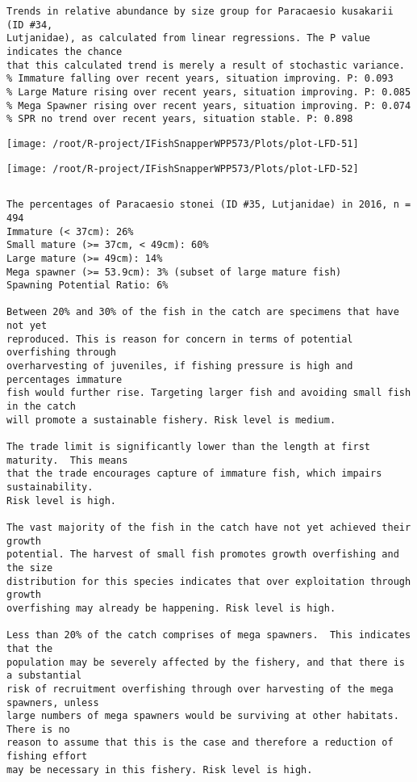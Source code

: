 \documentclass{report}\usepackage[]{graphicx}\usepackage[]{color}
\makeatletter
\def\maxwidth{ %
  \ifdim\Gin@nat@width>\linewidth
    \linewidth
  \else
    \Gin@nat@width
  \fi
}
\newenvironment{kframe}{%
 \def\at@end@of@kframe{}%
 \ifinner\ifhmode%
  \def\at@end@of@kframe{\end{minipage}}%
  \begin{minipage}{\columnwidth}%
 \fi\fi%
 \def\FrameCommand##1{\hskip\@totalleftmargin \hskip-\fboxsep
 \colorbox{shadecolor}{##1}\hskip-\fboxsep
     \hskip-\linewidth \hskip-\@totalleftmargin \hskip\columnwidth}%
 \MakeFramed {\advance\hsize-\width
   \@totalleftmargin\z@ \linewidth\hsize
   \@setminipage}}%
 {\par\unskip\endMakeFramed%
 \at@end@of@kframe}
\newenvironment{knitrout}{}{} %
\makeatother
\begin{document}
\begin{knitrout}
\begin{kframe}
\begin{verbatim}
Trends in relative abundance by size group for Paracaesio kusakarii (ID #34,
Lutjanidae), as calculated from linear regressions. The P value indicates the chance
that this calculated trend is merely a result of stochastic variance.
% Immature falling over recent years, situation improving. P: 0.093
% Large Mature rising over recent years, situation improving. P: 0.085
% Mega Spawner rising over recent years, situation improving. P: 0.074
% SPR no trend over recent years, situation stable. P: 0.898
\end{verbatim}
\end{kframe}
\texttt{[image: /root/R-project/IFishSnapperWPP573/Plots/plot-LFD-51]} 

\texttt{[image: /root/R-project/IFishSnapperWPP573/Plots/plot-LFD-52]} 
\begin{kframe}\begin{verbatim}
\end{verbatim}
\end{kframe}
\clearpage
\newpage
\begin{kframe}\begin{verbatim}The percentages of Paracaesio stonei (ID #35, Lutjanidae) in 2016, n = 494
Immature (< 37cm): 26%
Small mature (>= 37cm, < 49cm): 60%
Large mature (>= 49cm): 14%
Mega spawner (>= 53.9cm): 3% (subset of large mature fish)
Spawning Potential Ratio: 6%
 
Between 20% and 30% of the fish in the catch are specimens that have not yet
reproduced. This is reason for concern in terms of potential overfishing through
overharvesting of juveniles, if fishing pressure is high and percentages immature
fish would further rise. Targeting larger fish and avoiding small fish in the catch
will promote a sustainable fishery. Risk level is medium.

The trade limit is significantly lower than the length at first maturity.  This means
that the trade encourages capture of immature fish, which impairs sustainability.
Risk level is high.

The vast majority of the fish in the catch have not yet achieved their growth
potential. The harvest of small fish promotes growth overfishing and the size
distribution for this species indicates that over exploitation through growth
overfishing may already be happening. Risk level is high.

Less than 20% of the catch comprises of mega spawners.  This indicates that the
population may be severely affected by the fishery, and that there is a substantial
risk of recruitment overfishing through over harvesting of the mega spawners, unless
large numbers of mega spawners would be surviving at other habitats. There is no
reason to assume that this is the case and therefore a reduction of fishing effort
may be necessary in this fishery. Risk level is high.
 

\end{verbatim}
\end{kframe}
\end{knitrout}
\end{document}
